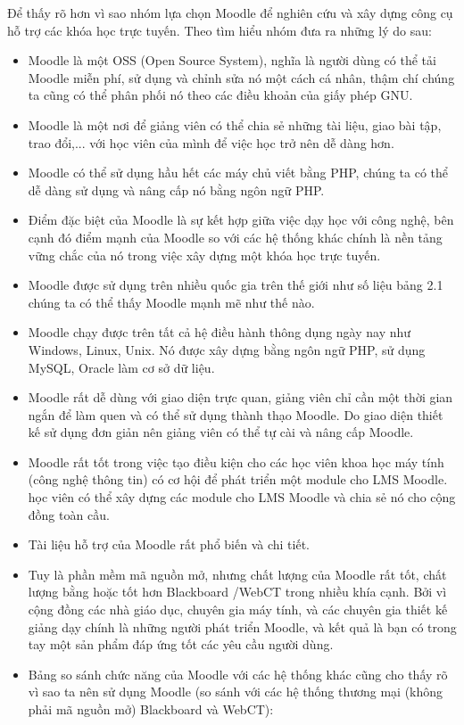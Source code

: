 Để thấy rõ hơn vì sao nhóm lựa chọn Moodle để nghiên cứu và xây dựng công cụ hỗ trợ các khóa học trực tuyến. Theo tìm hiểu nhóm đưa ra những lý do \cite{whymoodle} sau: 
\begin{itemize}
	\item Moodle là một OSS (Open Source System), nghĩa là người dùng có thể tải Moodle miễn phí, sử dụng và chỉnh sửa nó một cách cá nhân, thậm chí chúng ta cũng có thể phân phối nó theo các điều khoản của giấy phép GNU.
	\item Moodle là một nơi để giảng viên có thể chia sẻ những tài liệu, giao bài tập, trao đổi,... với học viên của mình để việc học trở nên dễ dàng hơn.
	\item Moodle có thể sử dụng hầu hết các máy chủ viết bằng PHP, chúng ta có thể dễ dàng sử dụng và nâng cấp nó bằng ngôn ngữ PHP.
	\item Điểm đặc biệt của Moodle là sự kết hợp giữa việc dạy học với công nghệ, bên cạnh đó điểm mạnh của Moodle so với các hệ thống khác chính là nền tảng vững chắc của nó trong việc xây dựng một khóa học trực tuyến.
	\item Moodle được sử dụng trên nhiều quốc gia trên thế giới như số liệu bảng 2.1 chúng ta có thể thấy Moodle mạnh mẽ như thế nào.
	\item Moodle chạy được trên tất cả hệ điều hành thông dụng ngày nay như Windows, Linux, Unix. Nó được xây dựng bằng ngôn ngữ PHP, sử dụng MySQL, Oracle làm cơ sở dữ liệu.
	\item Moodle rất dễ dùng với giao diện trực quan, giảng viên chỉ cần một thời gian ngắn để làm quen và có thể sử dụng thành thạo Moodle. Do giao diện thiết kế sử dụng đơn giản nên giảng viên có thể tự cài và nâng cấp Moodle.
	\item Moodle rất tốt trong việc tạo điều kiện cho các học viên khoa học máy tính (công nghệ thông tin) có cơ hội để phát triển một module cho LMS Moodle. học viên có thể xây dựng các module cho LMS Moodle và chia sẻ nó cho cộng đồng toàn cầu. 
	\item Tài liệu hỗ trợ của Moodle rất phổ biến và chi tiết.
	\item Tuy là phần mềm mã nguồn mở, nhưng chất lượng của Moodle rất tốt, chất lượng bằng hoặc tốt hơn Blackboard /WebCT trong nhiều khía cạnh. Bởi vì cộng đồng các nhà giáo dục, chuyên gia máy tính, và các chuyên gia thiết kế giảng dạy chính là những người phát triển Moodle, và kết quả là bạn có trong tay một sản phẩm đáp ứng tốt các yêu cầu người dùng.
	\item Bảng so sánh chức năng của Moodle với các hệ thống khác cũng cho thấy rõ vì sao ta nên sử dụng Moodle (so sánh với các hệ thống thương mại (không phải mã nguồn mở) Blackboard và WebCT): 

\end{itemize}

